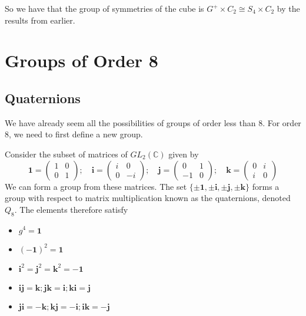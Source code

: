 \documentclass{article}
\begin{document}
So we have that the group of symmetries of the cube is $G^+ \times C_2 \cong S_4 \times C_2$ by the results from earlier.

\section{Groups of Order 8}
\subsection{Quaternions}
We have already seem all the possibilities of groups of order less than 8. For order 8, we need to first define a new group.
\begin{definition}
	Consider the subset of matrices of $GL_2(\mathbb C)$ given by
	\[ \bm 1 = \begin{pmatrix}
			1 & 0 \\ 0 & 1
		\end{pmatrix};\quad \bm i = \begin{pmatrix}
			i & 0 \\ 0 & -i
		\end{pmatrix};\quad \bm j = \begin{pmatrix}
			0 & 1 \\ -1 & 0
		\end{pmatrix};\quad \bm k = \begin{pmatrix}
			0 & i \\ i & 0
		\end{pmatrix} \]
	We can form a group from these matrices. The set $\{ \pm \bm 1, \pm \bm i, \pm \bm j, \pm \bm k \}$ forms a group with respect to matrix multiplication known as the quaternions, denoted $Q_8$. The elements therefore satisfy
	\begin{itemize}
		\item $g^4 = \bm 1$
		\item $(-\bm 1)^2 = \bm 1$
		\item $\bm i^2 = \bm j^2 = \bm k^2 = -\bm 1$
		\item $\bm i \bm j = \bm k; \bm j \bm k = \bm i; \bm k \bm i = \bm j$
		\item $\bm j \bm i = -\bm k; \bm k \bm j = -\bm i; \bm i \bm k = -\bm j$
	\end{itemize}
\end{definition}
\end{document}
